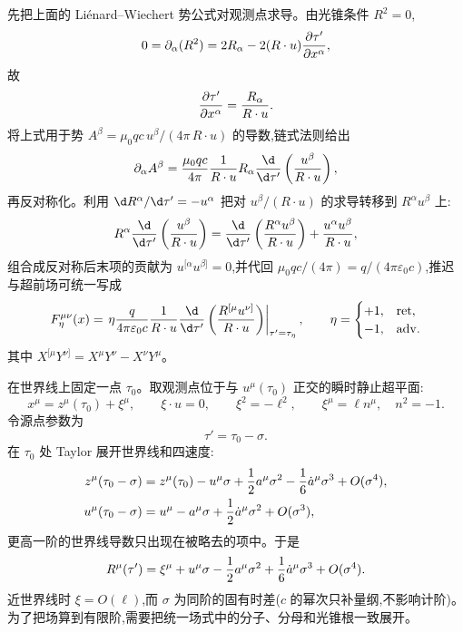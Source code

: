 先把上面的 Liénard--Wiechert 势公式对观测点求导。由光锥条件 $R^2=0$,
\begin{equation*}
 0=\partial_\alpha(R^2)
 =2R_\alpha-2(R\cdot u){\partial\tau'\over\partial x^\alpha},
\end{equation*}
故
\begin{equation*}
 {\partial\tau'\over\partial x^\alpha}
 ={R_\alpha\over R\cdot u}.
\end{equation*}
将上式用于势 $A^\beta=\mu_0qc\,u^\beta/(4\pi\,R\cdot u)$ 的导数,链式法则给出
\begin{equation*}
 \partial_\alpha A^\beta
 ={\mu_0qc\over4\pi}{1\over R\cdot u}
 R_\alpha{\d\over\d\tau'}
 \left({u^\beta\over R\cdot u}\right),
\end{equation*}
再反对称化。利用 $\d R^\alpha/\d\tau'=-u^\alpha$ 把对 $u^\beta/(R\cdot u)$ 的求导转移到 $R^\alpha u^\beta$ 上:
\begin{equation*}
 R^\alpha{\d\over\d\tau'}\left({u^\beta\over R\cdot u}\right)
 ={\d\over\d\tau'}\left({R^\alpha u^\beta\over R\cdot u}\right)
 +{u^\alpha u^\beta\over R\cdot u},
\end{equation*}
组合成反对称后末项的贡献为 $u^{[\alpha}u^{\beta]}=0$,并代回 $\mu_0qc/(4\pi)=q/(4\pi\varepsilon_0c)$,推迟与超前场可统一写成
\begin{equation*}
 F_\eta^{\mu\nu}(x)
 =\left.
 \eta{q\over4\pi\varepsilon_0c}
 {1\over R\cdot u}{\d\over\d\tau'}
 \left({R^{[\mu}u^{\nu]}\over R\cdot u}\right)
 \right|_{\tau'=\tau_\eta},
 \qquad
 \eta=\begin{cases}+1,&\mathrm{ret},\\-1,&\mathrm{adv}.\end{cases}
\end{equation*}
其中 $X^{[\mu}Y^{\nu]}=X^\mu Y^\nu-X^\nu Y^\mu$。

在世界线上固定一点 $\tau_0$。取观测点位于与 $u^\mu(\tau_0)$ 正交的瞬时静止超平面:
\begin{equation*}
 x^\mu=z^\mu(\tau_0)+\xi^\mu,
 \qquad
 \xi\cdot u=0,
 \qquad
 \xi^2=-\ell^2,
 \qquad
 \xi^\mu=\ell n^\mu,
 \quad
 n^2=-1.
\end{equation*}
令源点参数为
\begin{equation*}
 \tau'=\tau_0-\sigma.
\end{equation*}
在 $\tau_0$ 处 Taylor 展开世界线和四速度:
\begin{align*}
 z^\mu(\tau_0-\sigma)
 &=z^\mu(\tau_0)-u^\mu\sigma
 +{1\over2}a^\mu\sigma^2
 -{1\over6}\dot a^\mu\sigma^3
 +O(\sigma^4),\\
 u^\mu(\tau_0-\sigma)
 &=u^\mu-a^\mu\sigma
 +{1\over2}\dot a^\mu\sigma^2
 +O(\sigma^3),
\end{align*}
更高一阶的世界线导数只出现在被略去的项中。于是
\begin{equation*}
 R^\mu(\tau')
 =\xi^\mu+u^\mu\sigma
 -{1\over2}a^\mu\sigma^2
 +{1\over6}\dot a^\mu\sigma^3
 +O(\sigma^4).
\end{equation*}
近世界线时 $\xi=O(\ell)$,而 $\sigma$ 为同阶的固有时差($c$ 的幂次只补量纲,不影响计阶)。为了把场算到有限阶,需要把统一场式中的分子、分母和光锥根一致展开。

